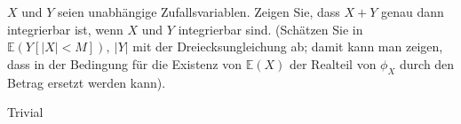 \begin{exercise}
$X$ und $Y$ seien unabhängige Zufallsvariablen.  Zeigen Sie, dass $X + Y$ genau
dann integrierbar ist, wenn $X$ und $Y$ integrierbar sind. (Schätzen Sie in
$\mathbb{E}(Y[|X| < M]),~ |Y|$ mit der Dreiecksungleichung ab; damit kann man
zeigen, dass in der Bedingung für die Existenz von $\mathbb{E}(X)$ der Realteil
von $\phi_X$ durch den Betrag ersetzt werden kann).
\end{exercise}

\begin{solution}

Trivial

\end{solution}

